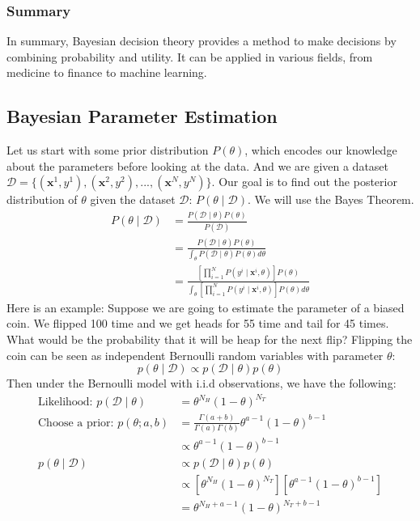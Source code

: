 \documentclass{article}
\begin{document}
\subsubsection{Summary}
In summary, Bayesian decision theory provides a method to make decisions by combining probability and utility. It can be applied in various fields, from medicine to finance to machine learning.
\newpage

\subsection{Bayesian Parameter Estimation}
Let us start with some prior distribution $P(\theta)$, which encodes our knowledge about the parameters before looking at the data. And we are given a dataset $\mathcal{D} = \{ (\bm{x}^1, y^1), (\bm{x}^2, y^2), ..., (\bm{x}^N, y^N) \}$. Our goal is to find out the posterior distribution of $\theta$ given the dataset $\mathcal{D}$: $P(\theta \mid \mathcal{D})$. We will use the Bayes Theorem.
\begin{align*}
    P(\theta \mid \mathcal{D})
    &= \frac{P(\mathcal{D} \mid \theta)P(\theta)}{P(\mathcal{D})}\\
    &= \frac{P(\mathcal{D} \mid \theta)P(\theta)}{\int_{\theta} P(\mathcal{D} \mid \theta)P(\theta)d\theta}\\
    &= \frac{ \left[ \prod_{i=1}^{N}P( y^i \mid \bm{x}^i ,\theta) \right] P(\theta)}{\int_{\theta} \left[ \prod_{i=1}^{N}P( y^i \mid \bm{x}^i ,\theta) \right]P(\theta)d\theta}
\end{align*}
Here is an example: Suppose we are going to estimate the parameter of a biased coin. We flipped 100 time and we get heads for 55 time and tail for 45 times. What would be the probability that it will be heap for the next flip? Flipping the coin can be seen as independent Bernoulli random variables with parameter $\theta$:
\[ p(\theta \mid \mathcal{D}) \propto p(\mathcal{D} \mid \theta)p(\theta) \]
Then under the Bernoulli model with i.i.d observations, we have the following:
\begin{align*}
    \text{Likelihood: } p(\mathcal{D} \mid \theta) &= \theta^{N_H}(1-\theta)^{N_T}\\
    \text{Choose a prior: } p(\theta; a,b) &= \frac{\Gamma(a+b)}{\Gamma(a)\Gamma(b)}\theta^{a-1}(1-\theta)^{b-1}\\
    & \propto \theta^{a-1}(1-\theta)^{b-1}\\
    p(\theta \mid \mathcal{D}) & \propto p(\mathcal{D} \mid \theta)p(\theta)\\
    & \propto \left[ \theta^{N_H}(1-\theta)^{N_T} \right] \left[ \theta^{a-1}(1-\theta)^{b-1} \right]\\
    & = \theta^{N_H+a-1}(1-\theta)^{N_T+b-1}
\end{align*}
\end{document}
